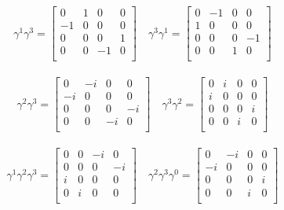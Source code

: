 \documentclass{article}
\begin{document}
\begin{align*}
\gamma^1 \gamma^3 = \begin{bmatrix}
 0  &  1  &  0  &  0  \\
 -1  &  0  &  0  &  0  \\
 0  &  0  &  0  &  1  \\
 0  &  0  &  -1  &  0  \\
\end{bmatrix} \quad
\gamma^3 \gamma^1 = \begin{bmatrix}
 0  &  -1  &  0  &  0  \\
 1  &  0  &  0  &  0  \\
 0  &  0  &  0  &  -1  \\
 0  &  0  &  1  &  0  \\
\end{bmatrix}
\end{align*}

\begin{align*}
\gamma^2 \gamma^3 = \begin{bmatrix}
 0  &  -i  &  0  &  0  \\
 -i  &  0  &  0  &  0  \\
 0  &  0  &  0  &  -i  \\
 0  &  0  &  -i  &  0  \\
\end{bmatrix} \quad
\gamma^3 \gamma^2 = \begin{bmatrix}
 0  &  i  &  0  &  0  \\
 i  &  0  &  0  &  0  \\
 0  &  0  &  0  &  i  \\
 0  &  0  &  i  &  0  \\
\end{bmatrix}
\end{align*}

\begin{align*}
\gamma^1 \gamma^2 \gamma^3 = \begin{bmatrix}
 0  &  0  &  -i  &  0  \\
 0  &  0  &  0  &  -i  \\
 i  &  0  &  0  &  0  \\
 0  &  i  &  0  &  0  \\
\end{bmatrix} \quad
\gamma^2 \gamma^3 \gamma^0 = \begin{bmatrix}
 0  &  -i  &  0  &  0  \\
 -i  &  0  &  0  &  0  \\
 0  &  0  &  0  &  i  \\
 0  &  0  &  i  &  0  \\
\end{bmatrix}
\end{align*}
\end{document}

